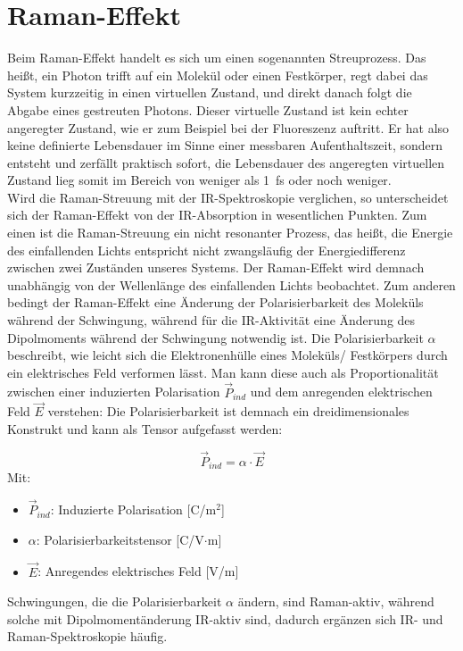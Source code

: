 \section{Raman-Effekt}\label{sec:raman}
Beim Raman-Effekt handelt es sich um einen sogenannten Streuprozess. Das heißt, ein Photon trifft auf ein Molekül oder einen Festkörper, regt 
dabei das System kurzzeitig in einen virtuellen Zustand, und direkt danach folgt die Abgabe eines gestreuten Photons. Dieser virtuelle Zustand 
ist kein \glqq{}echter\grqq{} angeregter Zustand, wie er zum Beispiel bei der Fluoreszenz auftritt. Er hat also keine definierte Lebensdauer 
im Sinne einer messbaren Aufenthaltszeit, sondern entsteht und zerfällt praktisch sofort, die Lebensdauer des angeregten virtuellen Zustand 
lieg somit im Bereich von weniger als 1~fs oder noch weniger.\\
Wird die Raman-Streuung mit der IR-Spektroskopie verglichen, so unterscheidet sich der Raman-Effekt von der IR-Absorption in wesentlichen Punkten.
Zum einen ist die Raman-Streuung ein nicht resonanter Prozess, das heißt, die Energie des einfallenden Lichts entspricht nicht zwangsläufig der Energiedifferenz zwischen 
zwei Zuständen unseres Systems. Der Raman-Effekt wird demnach unabhängig von der Wellenlänge des einfallenden Lichts beobachtet.
Zum anderen bedingt der Raman-Effekt eine Änderung der Polarisierbarkeit des Moleküls während der Schwingung, während für
die IR-Aktivität eine Änderung des Dipolmoments während der Schwingung notwendig ist. Die Polarisierbarkeit $\alpha$ beschreibt, 
wie leicht sich die Elektronenhülle eines Moleküls/ Festkörpers durch ein elektrisches Feld verformen lässt.
Man kann diese auch als Proportionalität zwischen einer induzierten Polarisation $\vec{P}_{ind}$ und dem anregenden elektrischen Feld $\vec{E}$ verstehen:
Die Polarisierbarkeit ist demnach ein dreidimensionales Konstrukt und kann als Tensor aufgefasst werden:

\begin{equation}
    \vec{P}_{ind} = \alpha \cdot \vec{E}
\end{equation}
Mit:
\begin{itemize}
    \item $\vec{P}_{ind}$: Induzierte Polarisation [C/m$^2$]
    \item $\alpha$: Polarisierbarkeitstensor [C/V$\cdot$m]
    \item $\vec{E}$: Anregendes elektrisches Feld [V/m]
\end{itemize}

Schwingungen, die die Polarisierbarkeit $\alpha$ ändern, sind 
Raman-aktiv, während solche mit Dipolmomentänderung IR-aktiv sind, dadurch ergänzen sich IR- und Raman-Spektroskopie häufig.\\

